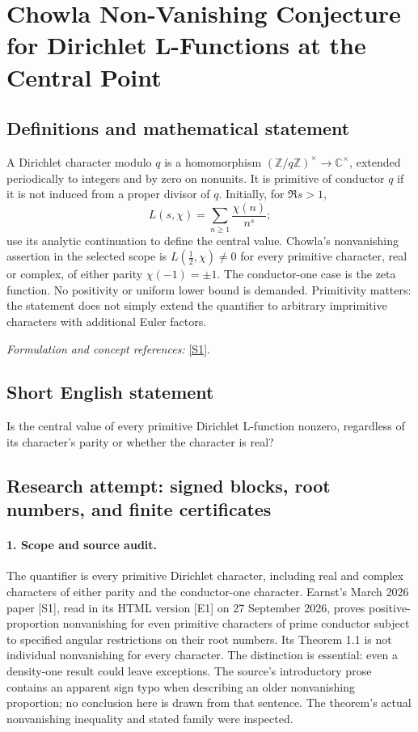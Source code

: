 \documentclass[11pt]{article}
\begin{document}
\section*{\texorpdfstring{Chowla Non-Vanishing Conjecture for Dirichlet L-Functions at the Central Point}{Chowla Non-Vanishing Conjecture for Dirichlet L-Functions at the Central Point}}\label{30006860}
\subsection{Definitions and mathematical statement}
A Dirichlet character modulo $q$ is a homomorphism $({\mathbb{Z}}/q{\mathbb{Z}})^\times\to{\mathbb{C}}^\times$, extended periodically to integers and by zero on nonunits. It is primitive of conductor $q$ if it is not induced from a proper divisor of $q$. Initially, for $\Re s>1$,
\[
 L(s,\chi)=\sum_{n\ge1}\frac{\chi(n)}{n^s};
\]
use its analytic continuation to define the central value. Chowla's nonvanishing assertion in the selected scope is $L(\tfrac12,\chi)\ne0$ for every primitive character, real or complex, of either parity $\chi(-1)=\pm1$. The conductor-one case is the zeta function. No positivity or uniform lower bound is demanded. Primitivity matters: the statement does not simply extend the quantifier to arbitrary imprimitive characters with additional Euler factors.
\par\smallskip\textit{Formulation and concept references:} \href{https://arxiv.org/pdf/2603.22124v1}{[S1]}.

\subsection{Short English statement}
Is the central value of every primitive Dirichlet L-function nonzero, regardless of its character's parity or whether the character is real?
\subsection{Research attempt: signed blocks, root numbers, and finite certificates}
\paragraph{1. Scope and source audit.}
The quantifier is every primitive Dirichlet character, including real and complex characters of either parity and the conductor-one character. Earnst's March 2026 paper [S1], read in its HTML version [E1] on 27 September 2026, proves positive-proportion nonvanishing for even primitive characters of prime conductor subject to specified angular restrictions on their root numbers. Its Theorem 1.1 is not individual nonvanishing for every character. The distinction is essential: even a density-one result could leave exceptions. The source's introductory prose contains an apparent sign typo when describing an older nonvanishing proportion; no conclusion here is drawn from that sentence. The theorem's actual nonvanishing inequality and stated family were inspected.
\end{document}
